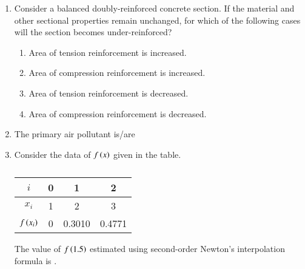 \documentclass[journal,12pt,onecolumn]{article}
\theoremstyle{remark}
\begin{document}
\begin{enumerate}
    \hfill{}
    \begin{enumerate}
    \end{enumerate}

    \item Consider a balanced doubly-reinforced concrete section. If the material and other sectional properties remain unchanged, for which of the following cases will the section becomes under-reinforced?
    
    \hfill{}
    \begin{enumerate}
        \item Area of tension reinforcement is increased.
        \item Area of compression reinforcement is increased.
        \item Area of tension reinforcement is decreased.
        \item Area of compression reinforcement is decreased.
    \end{enumerate}

    \item The primary air pollutant is/are
    
    \hfill{}
    \begin{enumerate}
    \end{enumerate}

    \item Consider the data of $f\left(x\right)$ given in the table.
    \begin{table}[H]
        \centering
        \begin{tabular}{|c|c|c|c|}
            \hline
            $i$ & 0 & 1 & 2 \\
            \hline
            $x_i$ & 1 & 2 & 3 \\
            \hline
            $f\left(x_i\right)$ & 0 & 0.3010 & 0.4771 \\
            \hline
        \end{tabular}
        \caption{}
        \label{tab:q32}
    \end{table}
    The value of $f\left(1.5\right)$ estimated using second-order Newton's interpolation formula is \underline{\hspace{2cm}} .
    

\end{enumerate}
\end{document}

